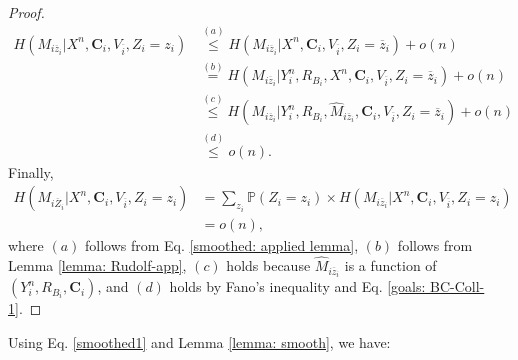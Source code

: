 \documentclass[runningheads]{llncs}
\newcommand{\parbreak}{ \vspace{0.3 em}}
\begin{document}
\begin{proof}
    \begin{align*}
        H(M_{i\overline{z}_i}|X^n, \mathbf{C}_i, V_{\overline{i}},Z_i = z_i) & \stackrel{(a)}{\leq} H(M_{i\overline{z}_i}|X^n, \mathbf{C}_i, V_{\overline{i}},Z_i = \overline{z}_i) + o(n)\\
        & \stackrel{(b)}{=} H(M_{i\overline{z}_i}|Y_i^n, R_{B_i} , X^n, \mathbf{C}_i, V_{\overline{i}},Z_i = \overline{z}_i) + o(n)\\
        & \stackrel{(c)}{\leq} H(M_{i\overline{z}_i}|Y_i^n, R_{B_i} , \hat{M}_{i\overline{z}_i}, \mathbf{C}_i, V_{\overline{i}},Z_i = \overline{z}_i) + o(n)\\
        & \stackrel{(d)}{\leq} o(n).
    \end{align*}
    Finally, 
    \begin{align*}
        H(M_{i\overline{Z}_i}|X^n, \mathbf{C}_i, V_{\overline{i}},Z_i = z_i) & = \sum_{z_i} \mathbb{P} (Z_i = z_i) \times H(M_{i\overline{z}_i}|X^n, \mathbf{C}_i, V_{\overline{i}},Z_i = z_i)\\
        & = o(n),
    \end{align*}
    where $(a)$ follows from Eq. \eqref{smoothed: applied lemma}, $(b)$ follows from Lemma \ref{lemma: Rudolf-app}, $(c)$ holds because $\hat{M}_{i\overline{z}_i}$ is a function of $(Y_i^n, R_{B_i}, \mathbf{C}_i)$, and $(d)$ holds by Fano's inequality and Eq. \eqref{goals: BC-Coll-1}.
\end{proof}
\parbreak Using Eq. \eqref{smoothed1} and Lemma \ref{lemma: smooth}, we have:
\end{document}
